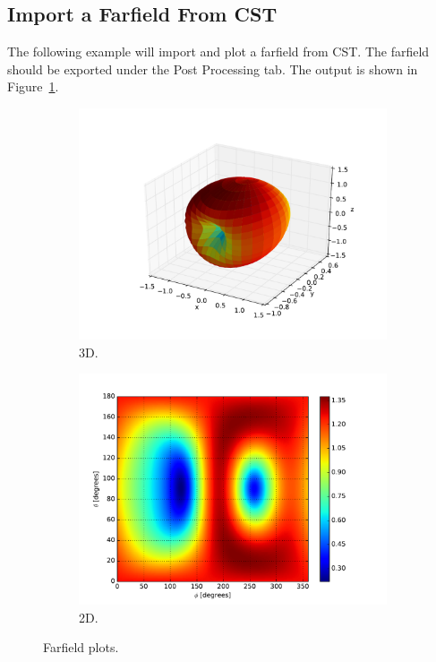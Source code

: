 \documentclass[10pt]{article}
\begin{document}
\clearpage
\subsection{Import a Farfield From CST}
The following example will import and plot a farfield from CST. The farfield should be exported under the Post Processing tab. The output is shown in Figure~\ref{fig:example3}.


\begin{figure}[htbp]
    \centering
    \begin{subfigure}{0.49\linewidth}
        \centering
        \includegraphics[scale=0.5]{examples/ex3_3dfarfield.pdf}
        \caption{3D.}
    \end{subfigure}
    \hfill
    \begin{subfigure}{0.49\linewidth}
        \centering
        \includegraphics[scale=0.5]{examples/ex3_2dfarfield.pdf}
        \caption{2D.}
    \end{subfigure}
    \caption{Farfield plots.}
    \label{fig:example3}
\end{figure}
\end{document}
